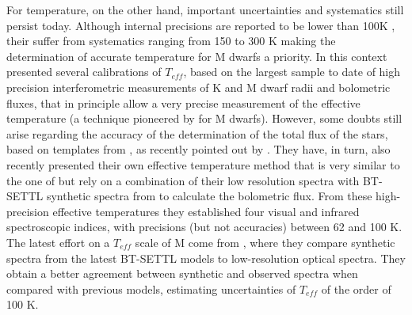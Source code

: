 \documentclass[referee]{aa}
\begin{document}
For temperature, on the other hand, important uncertainties and systematics still persist today. Although internal precisions are reported to be lower than 100K \citep[e.g.][]{Casagrande-2008,Rojas-Ayala-2012,Boyajian-2012}, their suffer from systematics ranging from 150 to 300 K making the determination of accurate temperature for M dwarfs a priority. In this context \citet{Boyajian-2012} presented several calibrations of $T_{eff}$, based on the largest sample to date of high precision interferometric measurements of K and M dwarf radii and bolometric fluxes, that in principle allow a very precise measurement of the effective temperature (a technique pioneered by \citet{Segransan-2003} for M dwarfs). However, some doubts still arise regarding the accuracy of the determination of the total flux of the stars, based on templates from \citet{Pickles-1998}, as recently pointed out by \citet[][]{Mann-2013b}. They have, in turn, also recently presented their own effective temperature method that is very similar to the one of \citet{Boyajian-2012} but rely on a combination of their low resolution spectra with BT-SETTL synthetic spectra from \citet{Allard-2011} to calculate the bolometric flux. From these high-precision effective temperatures they established four visual and infrared spectroscopic indices, with precisions (but not accuracies) between 62 and 100 K. The latest effort on a $T_{eff}$ scale of M come from \citet{Rajpurohit-2013a}, where they compare synthetic spectra from the latest BT-SETTL models \citep{Allard-2012} to low-resolution optical spectra. They obtain a better agreement between synthetic and observed spectra when compared with previous models, estimating uncertainties of $T_{eff}$ of the order of 100 K. 








\end{document}

